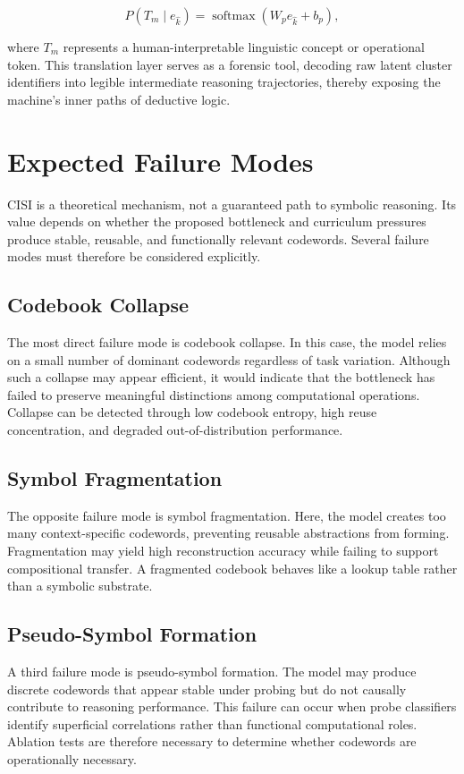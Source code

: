\begin{equation}
P(T_m \mid e_{\hat{k}}) = \operatorname{softmax}\left(W_p e_{\hat{k}} + b_p\right),
\end{equation}

where $T_m$ represents a human-interpretable linguistic concept or operational token. This translation layer serves as a forensic tool, decoding raw latent cluster identifiers into legible intermediate reasoning trajectories, thereby exposing the machine's inner paths of deductive logic.

\chapter{Expected Failure Modes}
CISI is a theoretical mechanism, not a guaranteed path to symbolic reasoning. Its value depends on whether the proposed bottleneck and curriculum pressures produce stable, reusable, and functionally relevant codewords. Several failure modes must therefore be considered explicitly.
\section{Codebook Collapse}
The most direct failure mode is codebook collapse. In this case, the model relies on a small number of dominant codewords regardless of task variation. Although such a collapse may appear efficient, it would indicate that the bottleneck has failed to preserve meaningful distinctions among computational operations. Collapse can be detected through low codebook entropy, high reuse concentration, and degraded out-of-distribution performance.
\section{Symbol Fragmentation}
The opposite failure mode is symbol fragmentation. Here, the model creates too many context-specific codewords, preventing reusable abstractions from forming. Fragmentation may yield high reconstruction accuracy while failing to support compositional transfer. A fragmented codebook behaves like a lookup table rather than a symbolic substrate.
\section{Pseudo-Symbol Formation}
A third failure mode is pseudo-symbol formation. The model may produce discrete codewords that appear stable under probing but do not causally contribute to reasoning performance. This failure can occur when probe classifiers identify superficial correlations rather than functional computational roles. Ablation tests are therefore necessary to determine whether codewords are operationally necessary.
